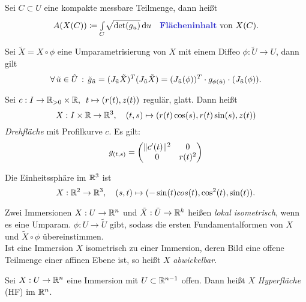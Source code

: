 \documentclass{cheat-sheet}
\begin{document}
\begin{defn}
  Sei $C \subset U$ eine kompakte messbare Teilmenge, dann heißt
  \[
    A(X(C)) \coloneqq \Int{C}{}{ \sqrt{\det(g_u)} }{u}
    \quad \text{\emph{Flächeninhalt} von $X(C)$.}
  \]
\end{defn}

\begin{satz}
  Sei $\tilde{X} = X \circ \phi$ eine Umparametrisierung von $X$ mit einem Diffeo $\phi : \tilde{U} \to U$, dann gilt
  \[ \forall \, {\tilde{u} \in \tilde{U}} \,:\, \tilde{g}_{\tilde{u}} = (J_{\tilde{u}} \tilde{X})^T (J_{\tilde{u}} \tilde{X}) = (J_{\tilde{u}}(\phi))^T \cdot g_{\phi(\tilde{u})} \cdot (J_{\tilde{u}}(\phi)). \]
\end{satz}

\begin{bsp}
  Sei $c : I \to \mathbb{R}_{> 0} \times \mathbb{R}, \enspace t \mapsto (r(t), z(t))$ regulär, glatt. Dann heißt
  \[ X : I \times \mathbb{R} \to \mathbb{R}^3, \quad (t, s) \mapsto (r(t) \cos(s), r(t) \sin(s), z(t)) \]
  \emph{Drehfläche} mit Profilkurve $c$. Es gilt:
  \[ g_{(t, s)} = \begin{pmatrix} \lVert c'(t)\rVert^2 & 0 \\ 0 & r(t)^2 \end{pmatrix} \]
\end{bsp}

\begin{bsp}[Kugelfläche] Die Einheitssphäre im $\mathbb{R}^3$ ist
\[ X : \mathbb{R}^2 \to \mathbb{R}^3, \quad (s, t) \mapsto (- \sin(t) cos(t), \cos^2(t), \sin(t)). \]
\end{bsp}

\begin{defn}
  Zwei Immersionen $X : U \to \mathbb{R}^n$ und $\tilde{X} : \tilde{U} \to \mathbb{R}^k$ heißen \emph{lokal isometrisch}, wenn es eine Umparam. $\phi : U \to \tilde{U}$ gibt, sodass die ersten Fundamentalformen von $X$ und $\tilde{X} \circ \phi$ übereinstimmen. \\
  Ist eine Immersion $X$ isometrisch zu einer Immersion, deren Bild eine offene Teilmenge einer affinen Ebene ist, so heißt $X$ \emph{abwickelbar}.
\end{defn}



\begin{defn}
  Sei $X : U \to \mathbb{R}^n$ eine Immersion mit $U \subset \mathbb{R}^{n-1}$ offen. Dann heißt $X$ \emph{Hyperfläche} (HF) im $\mathbb{R}^n$.
\end{defn}
\end{document}
